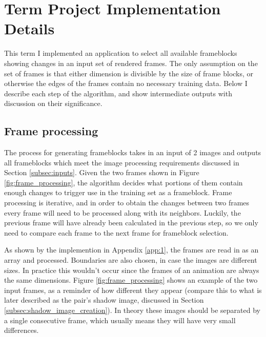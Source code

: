\documentclass[conference]{IEEEtran}
\begin{document}
%

\section{Term Project Implementation Details}
\label{sec:implementation}
This term I implemented an application to select all available frameblocks
showing changes in an input set of rendered frames. The only assumption on the
set of frames is that either dimension is divisible by the size of frame blocks,
or otherwise the edges of the frames contain no necessary training data. Below I
describe each step of the algorithm, and show intermediate outputs with
discussion on their significance.

\subsection{Frame processing}
\label{subsec:frame_processing}
The process for generating frameblocks takes in an input of 2 images and
outputs all frameblocks which meet the image processing requirements discussed
in Section \ref{subsec:inputs}.
Given the two frames shown in Figure \ref{fig:frame_processing},
the algorithm decides what portions of them contain enough changes to trigger
use in the training set as a frameblock.
Frame processing is iterative, and in order to obtain the changes between two
frames every frame will need to be processed along with its neighbors.
Luckily, the previous frame will have already been calculated in the previous
step, so we only need to compare each frame to the next frame for frameblock
selection.

As shown by the implemention in Appendix \ref{app:1}, the frames are
read in as an array and processed.
Boundaries are also chosen, in case the images are different sizes.
In practice this wouldn't occur since the frames of an animation are always the
same dimensions.
Figure \ref{fig:frame_processing} shows an example of the two input frames,
as a reminder of how different they appear (compare this to what is later
described as the pair's shadow image, discussed in Section
\ref{subsec:shadow_image_creation}).
In theory these images should be separated by a single consecutive frame,
which usually means they will have very small differences.
\end{document}
